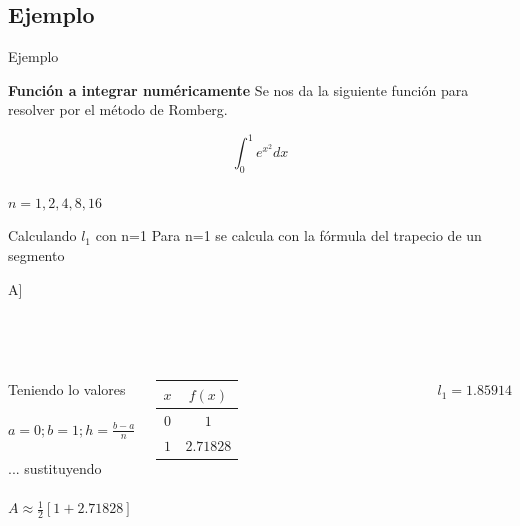 \documentclass{beamer}
\begin{document}
\subsection{Ejemplo}
\begin{frame}{Ejemplo}
\begin{exampleblock}
	{\centering\bf{Función a integrar numéricamente}}
Se nos da la siguiente función para resolver por el método de Romberg.
\begin{center}
\alert{{\huge \[\int_{0}^{1}e^{x^{2}}dx\]}}\\
\alert{{\LARGE $n=1,2,4,8,16$}}\\
\par\end{center}
\end{exampleblock} 
\end{frame}


\begin{frame}{Calculando $l_{1}$ con n=1 }
Para \alert{n=1} se calcula con la fórmula del trapecio de un segmento 
\begin{center}
\alert{{\small A\approx{}\left[f(b)+f(a)\right]]}}
\par\end{center}
\\$\,$\\
\begin{columns}
Teniendo lo valores
\\$\,$\\
\alert{$a=0; b=1; h=\frac{b-a}{n}$}
\\$\,$\\ 
... sustituyendo
\\$\,$\\
\alert{$A\approx\frac{1}{2}\left[1+2.71828\right]$}

\begin{tabular}{|c|c|}
\hline 
$x$ & $f(x)$\tabularnewline
\hline 
\hline 
$0$ & $1$\tabularnewline
\hline 
$1$ & $2.71828$\tabularnewline
\hline 
\end{tabular}
\\$\,$\\
\begin{LARGE}
\begin{center}
\color{green} $l_{1}=1.85914$
\par\end{center}
\end{LARGE}
\end{columns} 
\end{frame}
\end{document}
